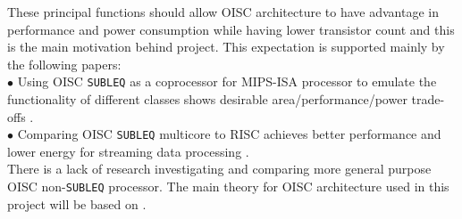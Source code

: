 \documentclass[a4paper,12pt]{article}
\begin{document}
\begin{multicols}{2}
These principal functions should allow OISC architecture to have advantage in performance and power consumption while having lower transistor count and this is the main motivation behind project. This expectation is supported mainly by the following papers:
\\
$\bullet$ Using OISC \texttt{SUBLEQ} as a coprocessor for MIPS-ISA processor to emulate the functionality of different classes shows desirable area/performance/power trade-offs \autocite{ahmed_sakamoto_anderson_hara-azumi_2015}.
\\
$\bullet$ Comparing OISC \texttt{SUBLEQ} multicore to RISC achieves better performance and lower energy for streaming data processing \autocite{yokota_saso_hara-azumi_2017}.
\\
There is a lack of research investigating and comparing more general purpose OISC non-\texttt{SUBLEQ} processor. The main theory for OISC architecture used in this project will be based on \autocite{ong_ang_seng_2010,gilreath_laplante_2003,kong_ang_seng_adejo_2010,dharshana_balasubramanian_arun_2016}.
\columnbreak

\end{multicols}
\end{document}
